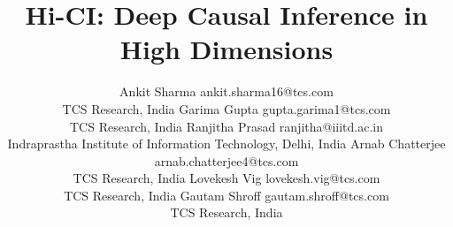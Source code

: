 \documentclass[twoside,11pt]{article}
\begin{document}
\title{Hi-CI: Deep Causal Inference in High Dimensions}

\author{\name Ankit Sharma \email ankit.sharma16@tcs.com \\
       \addr TCS Research, India
       \AND
       \name Garima Gupta \email gupta.garima1@tcs.com \\
       \addr TCS Research, India
       \AND
       \name Ranjitha Prasad \email ranjitha@iiitd.ac.in \\
       \addr Indraprastha Institute of Information Technology, Delhi, India
       \AND Arnab Chatterjee \email arnab.chatterjee4@tcs.com \\
       \addr TCS Research, India 
       \AND Lovekesh Vig \email
       lovekesh.vig@tcs.com \\ 
       \addr TCS Research, India 
       \AND Gautam Shroff \email
       gautam.shroff@tcs.com \\
       \addr TCS Research, India}

\editor{}

\maketitle
\end{document}
